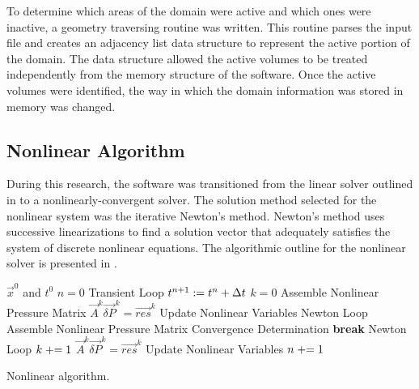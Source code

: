 To determine which areas of the domain were active and which ones were inactive, a geometry traversing routine was written.
This routine parses the \cobra{} input file and creates an adjacency list data structure to represent the active portion of the domain.
The data structure allowed the active volumes to be treated independently from the memory structure of the software.
Once the active volumes were identified, the way in which the domain information was stored in memory was changed.

\subsection{Nonlinear Algorithm}
\label{subsect:nlnCobraAlgo}

During this research, the \cobra{} software was transitioned from the linear solver outlined in  to a nonlinearly-convergent solver. 
The solution method selected for the nonlinear system was the iterative Newton's method.
Newton's method uses successive linearizations to find a solution vector that adequately satisfies the system of discrete nonlinear equations.
The algorithmic outline for the nonlinear solver is presented in .

\begin{algo}[ht!]
\setlength{\baselineskip}{0.625\baselineskip}
\begin{algorithmic}[1]
\Require $\vec{x}^{0}$ and $t^{0}$
\Set $n = 0$
\Loop \; Transient Loop
    \Set $t^{n+1} : = t^{n} + \dt{}$
    \Set $k = 0$
	\Algorithm Assemble Nonlinear Pressure Matrix	 
	\Solve $\vec{A}^{k} \vec{\delta P}^{k} = \vec{res}^{k}$
	\Algorithm Update Nonlinear Variables  
    \Loop \; Newton Loop
		\Algorithm Assemble Nonlinear Pressure Matrix 
		\Algorithm Convergence Determination 
			\State \textbf{break} Newton Loop 
		\EndIf		
		\Set $k \mathrel{+}= 1$
		\Solve $\vec{A}^{k} \vec{\delta P}^{k} = \vec{res}^{k}$
		\Algorithm Update Nonlinear Variables 
	\EndLoop
	\Set $n \mathrel{+}= 1$
\EndLoop
\end{algorithmic}
\caption{Nonlinear \cobra{} algorithm.}
\label{alg:nlnCobraAlgorithm}
\end{algo}

